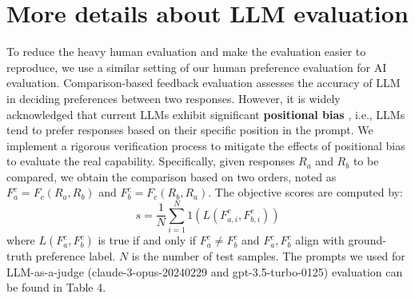 \documentclass[11pt]{article}
\begin{document}
\section{More details about LLM evaluation}
\label{apx:ai_eval}

To reduce the heavy human evaluation and make the evaluation easier to reproduce, we use a similar setting of our human preference evaluation for AI evaluation. 
Comparison-based feedback evaluation assesses the accuracy of LLM in deciding preferences between two responses. 
However, it is widely acknowledged that current LLMs exhibit significant \textbf{positional bias} \cite{lan2024criticbench,wang2023large,zheng2024judging,zeng2023evaluating}, i.e., LLMs tend to prefer responses based on their specific position in the prompt. 
We implement a rigorous verification process to mitigate the effects of positional bias to evaluate the real capability. Specifically, given responses \(R_a\) and \(R_b\) to be compared, we obtain the comparison based on two orders, noted as \(F^c_a = F_c(R_a, R_b)\) and \(F^c_b = F_c(R_b, R_a)\). The objective scores are computed by:
\[
s = \frac{1}{N} \sum_{i=1}^N 1(L(F^c_{a,i}, F^c_{b,i}))
\]
where \(L(F^c_a, F^c_b)\) is true if and only if \(F^c_a \neq F^c_b\) and \(F^c_a, F^c_b\) align with ground-truth preference label. \(N\) is the number of test samples.
The prompts we used for LLM-as-a-judge (claude-3-opus-20240229 and gpt-3.5-turbo-0125) evaluation can be found in Table 4.



\begin{table}
    \caption{Hyperparameter settings for Mistral 7B ReadCtrl.}
    \label{tab:hyperparameters}
\end{table}
\end{document}
